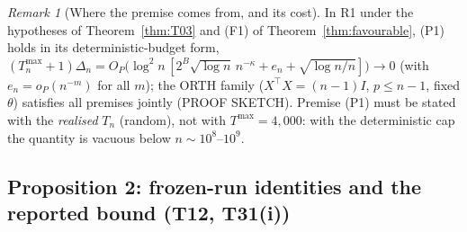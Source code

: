 \documentclass[11pt]{article}
\theoremstyle{definition}
\theoremstyle{remark}
\newtheorem{remark}{Remark}
\begin{document}
\begin{remark}[Where the premise comes from, and its cost]\label{rem:T26B}
In R1 under the hypotheses of Theorem~\ref{thm:T03} and (F1) of Theorem~\ref{thm:favourable}, (P1) holds in its deterministic-budget form, $(T^{\max}_n+1)\Delta_n=O_P\big(\log^2n\,[2^B\sqrt{\log n}\,n^{-\kappa}+e_n+\sqrt{\log n/n}]\big)\to0$ (with $e_n=o_P(n^{-m})$ for all $m$); the ORTH family ($X^\top X=(n-1)I$, $p\le n-1$, fixed $\theta$) satisfies all premises jointly (PROOF SKETCH). Premise (P1) must be stated with the \emph{realised} $T_n$ (random), not with $T^{\max}=4{,}000$: with the deterministic cap the quantity is vacuous below $n\sim10^8$--$10^9$.
\end{remark}

\subsection{Proposition 2: frozen-run identities and the reported bound (T12, T31(i))}
\end{document}

